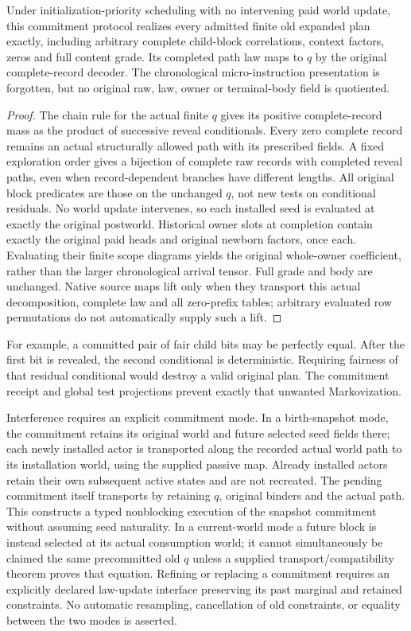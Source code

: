 \documentclass{article}
\begin{document}
\begin{proposition}
Under initialization-priority scheduling with no intervening paid world update, this commitment protocol realizes every admitted finite old expanded plan exactly, including arbitrary complete child-block correlations, context factors, zeros and full content grade. Its completed path law maps to $q$ by the original complete-record decoder. The chronological micro-instruction presentation is forgotten, but no original raw, law, owner or terminal-body field is quotiented.
\end{proposition}
\begin{proof}
The chain rule for the actual finite $q$ gives its positive complete-record mass as the product of successive reveal conditionals. Every zero complete record remains an actual structurally allowed path with its prescribed fields. A fixed exploration order gives a bijection of complete raw records with completed reveal paths, even when record-dependent branches have different lengths. All original block predicates are those on the unchanged $q$, not new tests on conditional residuals. No world update intervenes, so each installed seed is evaluated at exactly the original postworld. Historical owner slots at completion contain exactly the original paid heads and original newborn factors, once each. Evaluating their finite scope diagrams yields the original whole-owner coefficient, rather than the larger chronological arrival tensor. Full grade and body are unchanged. Native source maps lift only when they transport this actual decomposition, complete law and all zero-prefix tables; arbitrary evaluated row permutations do not automatically supply such a lift.
\end{proof}

For example, a committed pair of fair child bits may be perfectly equal. After the first bit is revealed, the second conditional is deterministic. Requiring fairness of that residual conditional would destroy a valid original plan. The commitment receipt and global test projections prevent exactly that unwanted Markovization.

Interference requires an explicit commitment mode. In a birth-snapshot mode, the commitment retains its original world and future selected seed fields there; each newly installed actor is transported along the recorded actual world path to its installation world, using the supplied passive map. Already installed actors retain their own subsequent active states and are not recreated. The pending commitment itself transports by retaining $q$, original binders and the actual path. This constructs a typed nonblocking execution of the snapshot commitment without assuming seed naturality. In a current-world mode a future block is instead selected at its actual consumption world; it cannot simultaneously be claimed the same precommitted old $q$ unless a supplied transport/compatibility theorem proves that equation. Refining or replacing a commitment requires an explicitly declared law-update interface preserving its past marginal and retained constraints. No automatic resampling, cancellation of old constraints, or equality between the two modes is asserted.
\end{document}
